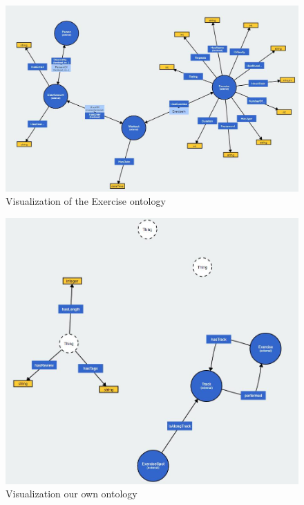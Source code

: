 \documentclass[11pt,a4paper]{scrreprt}
\begin{document}
\begin{figure}[h]
    \includegraphics[width=\textwidth]{exOntology.png}
    \caption{Visualization of the Exercise ontology}
    \label{db:exont}
\end{figure}
\begin{figure}[h]
    \includegraphics[width=\textwidth]{ownOntology.png}
    \caption{Visualization our own ontology}
    \label{db:ownont}
\end{figure}
\end{document}
